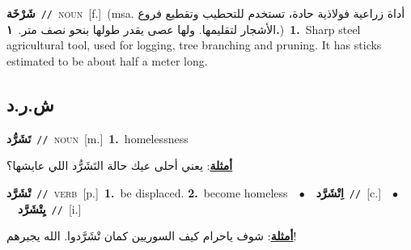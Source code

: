 \documentclass[10pt,a4paper,twoside]{article} %
\begin{document}
\begin{multicols}{2}
{\setlength\topsep{0pt}\textbf{\foreignlanguage{arabic}{شَرْخَة}}\ {\color{gray}\texttt{//}\color{black}}\ \textsc{noun}\ [f.]\ \color{gray}(msa. \foreignlanguage{arabic}{أداة زراعية فولاذية حادة، تستخدم للتحطيب وتقطيع فروع الأشجار لتقليمها. ولها عصى يقدر طولها بنحو نصف متر.}~\foreignlanguage{arabic}{\textbf{١.}})\color{black}\ \textbf{1.}~Sharp steel agricultural tool, used for logging, tree branching and pruning. It has sticks estimated to be about half a meter long.\ } \vspace{2mm}

\vspace{-3mm}
\subsection*{\color{blue}\foreignlanguage{arabic}{ش.ر.د}\color{blue}{}} 

{\setlength\topsep{0pt}\textbf{\foreignlanguage{arabic}{تَشَرُّد}}\ {\color{gray}\texttt{//}\color{black}}\ \textsc{noun}\ [m.]\ \textbf{1.}~homelessness\  \begin{flushright}\color{gray}\foreignlanguage{arabic}{\textbf{\underline{\foreignlanguage{arabic}{أمثلة}}}: يعني أحلى عيك حالة التَشَرُّد اللي عايشها؟}\end{flushright}\color{black}} \vspace{2mm}

{\setlength\topsep{0pt}\textbf{\foreignlanguage{arabic}{تْشَرَّد}}\ {\color{gray}\texttt{//}\color{black}}\ \textsc{verb}\ [p.]\ \textbf{1.}~be displaced.  \textbf{2.}~become homeless\ \ $\bullet$\ \ \setlength\topsep{0pt}\textbf{\foreignlanguage{arabic}{اِتْشَرَّد}}\ {\color{gray}\texttt{//}\color{black}}\ [c.]\ \ $\bullet$\ \ \setlength\topsep{0pt}\textbf{\foreignlanguage{arabic}{يِتْشَرَّد}}\ {\color{gray}\texttt{//}\color{black}}\ [i.]\  \begin{flushright}\color{gray}\foreignlanguage{arabic}{\textbf{\underline{\foreignlanguage{arabic}{أمثلة}}}: شوف ياحرام كيف السوريين كمان تْشَرَّدوا. الله يجبرهم!}\end{flushright}\color{black}} \vspace{2mm}


\end{multicols}
\end{document}
